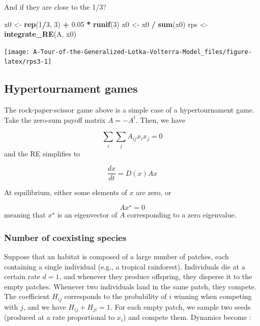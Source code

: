 \documentclass[]{book}
\newenvironment{Shaded}{\begin{snugshade}}{\end{snugshade}}
\newcommand{\DecValTok}[1]{\textcolor[rgb]{0.00,0.00,0.81}{#1}}
\newcommand{\FloatTok}[1]{\textcolor[rgb]{0.00,0.00,0.81}{#1}}
\newcommand{\KeywordTok}[1]{\textcolor[rgb]{0.13,0.29,0.53}{\textbf{#1}}}
\newcommand{\NormalTok}[1]{#1}
\newcommand{\OperatorTok}[1]{\textcolor[rgb]{0.81,0.36,0.00}{\textbf{#1}}}
\newcommand{\StringTok}[1]{\textcolor[rgb]{0.31,0.60,0.02}{#1}}
\begin{document}
And if they are close to the 1/3?

\begin{Shaded}
\begin{Highlighting}[]
\NormalTok{x0 <-}\StringTok{ }\KeywordTok{rep}\NormalTok{(}\DecValTok{1}\OperatorTok{/}\DecValTok{3}\NormalTok{, }\DecValTok{3}\NormalTok{) }\OperatorTok{+}\StringTok{ }\FloatTok{0.05} \OperatorTok{*}\StringTok{ }\KeywordTok{runif}\NormalTok{(}\DecValTok{3}\NormalTok{)}
\NormalTok{x0 <-}\StringTok{ }\NormalTok{x0 }\OperatorTok{/}\StringTok{ }\KeywordTok{sum}\NormalTok{(x0)}
\NormalTok{rps <-}\StringTok{ }\KeywordTok{integrate_RE}\NormalTok{(A, x0)}
\end{Highlighting}
\end{Shaded}

\begin{center}\texttt{[image: A-Tour-of-the-Generalized-Lotka-Volterra-Model\_files/figure-latex/rps3-1]} \end{center}

\hypertarget{hypertournament-games}{%
\subsection{Hypertournament games}\label{hypertournament-games}}

The rock-paper-scissor game above is a simple case of a hypertournament game. Take the zero-sum payoff matrix \(A = -A^t\). Then, we have

\[
\sum_i \sum_j A_{ij} x_i x_j = 0
\]
and the RE simplifies to

\[
\dfrac{d x}{dt} = D(x) A x
\]

At equilibrium, either some elements of \(x\) are zero, or

\[
A x^\star = 0
\]
meaning that \(x^\star\) is an eigenvector of \(A\) corresponding to a zero eigenvalue.

\hypertarget{number-of-coexisting-species}{%
\subsubsection{Number of coexisting species}\label{number-of-coexisting-species}}

Suppose that an habitat is composed of a large number of patches, each containing a single individual (e.g., a tropical rainforest). Individuals die at a certain rate \(d = 1\), and whenever they produce offspring, they disperse it to the empty patches. Whenever two individuals land in the same patch, they compete. The coefficient \(H_{ij}\) corresponds to the probability of \(i\) winning when competing with \(j\), and we have \(H_{ij} + H_{ji} = 1\). For each empty patch, we sample two seeds (produced at a rate proportional to \(x_i\)) and compete them. Dynamics become \citep{grilli2017higher}:
\end{document}
